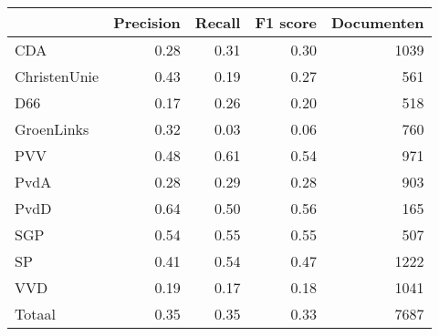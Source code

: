 \begin{tabular}{lrrrr}
\toprule
{} &  Precision &  Recall &  F1 score &  Documenten \\
\midrule
CDA          &       0.28 &    0.31 &      0.30 &        1039 \\
ChristenUnie &       0.43 &    0.19 &      0.27 &         561 \\
D66          &       0.17 &    0.26 &      0.20 &         518 \\
GroenLinks   &       0.32 &    0.03 &      0.06 &         760 \\
PVV          &       0.48 &    0.61 &      0.54 &         971 \\
PvdA         &       0.28 &    0.29 &      0.28 &         903 \\
PvdD         &       0.64 &    0.50 &      0.56 &         165 \\
SGP          &       0.54 &    0.55 &      0.55 &         507 \\
SP           &       0.41 &    0.54 &      0.47 &        1222 \\
VVD          &       0.19 &    0.17 &      0.18 &        1041 \\
Totaal       &       0.35 &    0.35 &      0.33 &        7687 \\
\bottomrule
\end{tabular}
